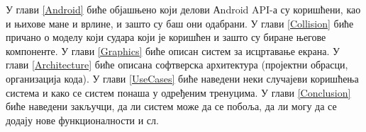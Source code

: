 У глави \ref{Android} биће објашњено који делови Аndroid API-а су коришћени, као и њихове мане и врлине, и зашто су баш они одабрани.
У глави  \ref{Collision} биће причано о моделу који судара који је коришћен и зашто су биране његове компоненте. У глави \ref{Graphics} биће описан систем за исцртавање екрана. У глави \ref{Architecture} биће описана софтверска архитектура (пројектни обрасци, организација кода). У глави \ref{UseCases} биће наведени неки случајеви коришћења система и како се систем понаша у одређеним тренуцима. У глави \ref{Conclusion} биће наведени закључци, да ли систем може да се побоља, да ли могу да се додају нове функционалности и сл.





